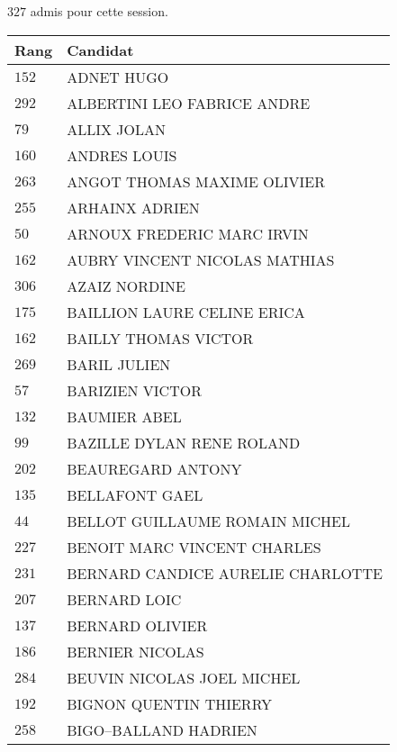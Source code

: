 




  $327$ admis pour cette session.

  \begin{xltabular}{\linewidth}{|l|X|}
    \hline
    \textbf{Rang} & \textbf{Candidat} \\
    \hline
    $152$ & ADNET HUGO \\
    \hline
    $292$ & ALBERTINI LEO FABRICE ANDRE \\
    \hline
    $79$ & ALLIX JOLAN \\
    \hline
    $160$ & ANDRES LOUIS \\
    \hline
    $263$ & ANGOT THOMAS MAXIME OLIVIER \\
    \hline
    $255$ & ARHAINX ADRIEN \\
    \hline
    $50$ & ARNOUX FREDERIC MARC IRVIN \\
    \hline
    $162$ & AUBRY VINCENT NICOLAS MATHIAS \\
    \hline
    $306$ & AZAIZ NORDINE \\
    \hline
    $175$ & BAILLION LAURE CELINE ERICA \\
    \hline
    $162$ & BAILLY THOMAS VICTOR \\
    \hline
    $269$ & BARIL JULIEN \\
    \hline
    $57$ & BARIZIEN VICTOR \\
    \hline
    $132$ & BAUMIER ABEL \\
    \hline
    $99$ & BAZILLE DYLAN RENE ROLAND \\
    \hline
    $202$ & BEAUREGARD ANTONY \\
    \hline
    $135$ & BELLAFONT GAEL \\
    \hline
    $44$ & BELLOT GUILLAUME ROMAIN MICHEL \\
    \hline
    $227$ & BENOIT MARC VINCENT CHARLES \\
    \hline
    $231$ & BERNARD CANDICE AURELIE CHARLOTTE \\
    \hline
    $207$ & BERNARD LOIC \\
    \hline
    $137$ & BERNARD OLIVIER \\
    \hline
    $186$ & BERNIER NICOLAS \\
    \hline
    $284$ & BEUVIN NICOLAS JOEL MICHEL \\
    \hline
    $192$ & BIGNON QUENTIN THIERRY \\
    \hline
    $258$ & BIGO--BALLAND HADRIEN \\

\end{xltabular}
